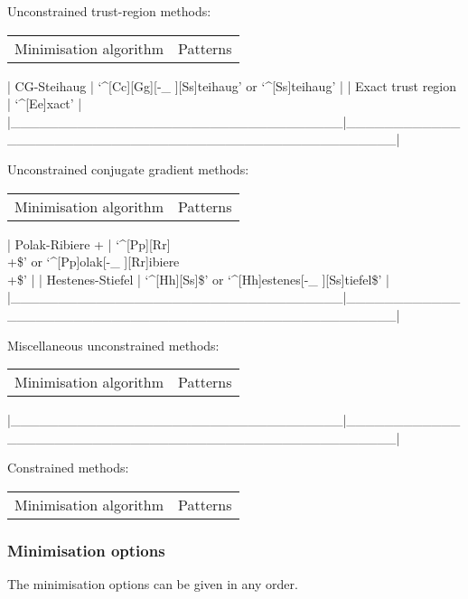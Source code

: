Unconstrained trust-region methods:


\begin{tabular}{cc}
Minimisation algorithm & Patterns \\
\end{tabular}
| CG-Steihaug                       | `\^{}[Cc][Gg][-\_ ][Ss]teihaug' or `\^{}[Ss]teihaug'       |
| Exact trust region                | `\^{}[Ee]xact'                                         |
|\_\_\_\_\_\_\_\_\_\_\_\_\_\_\_\_\_\_\_\_\_\_\_\_\_\_\_\_\_\_\_\_\_\_\_|\_\_\_\_\_\_\_\_\_\_\_\_\_\_\_\_\_\_\_\_\_\_\_\_\_\_\_\_\_\_\_\_\_\_\_\_\_\_\_\_\_\_\_\_\_\_\_\_\_\_\_\_\_|


Unconstrained conjugate gradient methods:


\begin{tabular}{cc}
Minimisation algorithm & Patterns \\
\end{tabular}
| Polak-Ribiere +                   | `\^{}[Pp][Rr]\\+\$' or `\^{}[Pp]olak[-\_ ][Rr]ibiere\\+\$'     |
| Hestenes-Stiefel                  | `\^{}[Hh][Ss]\$' or `\^{}[Hh]estenes[-\_ ][Ss]tiefel\$'      |
|\_\_\_\_\_\_\_\_\_\_\_\_\_\_\_\_\_\_\_\_\_\_\_\_\_\_\_\_\_\_\_\_\_\_\_|\_\_\_\_\_\_\_\_\_\_\_\_\_\_\_\_\_\_\_\_\_\_\_\_\_\_\_\_\_\_\_\_\_\_\_\_\_\_\_\_\_\_\_\_\_\_\_\_\_\_\_\_\_|


Miscellaneous unconstrained methods:


\begin{tabular}{cc}
Minimisation algorithm & Patterns \\
\end{tabular}
|\_\_\_\_\_\_\_\_\_\_\_\_\_\_\_\_\_\_\_\_\_\_\_\_\_\_\_\_\_\_\_\_\_\_\_|\_\_\_\_\_\_\_\_\_\_\_\_\_\_\_\_\_\_\_\_\_\_\_\_\_\_\_\_\_\_\_\_\_\_\_\_\_\_\_\_\_\_\_\_\_\_\_\_\_\_\_\_\_|


Constrained methods:


\begin{tabular}{cc}
Minimisation algorithm & Patterns \\
\end{tabular}



\subsubsection{Minimisation options}

The minimisation options can be given in any order.


